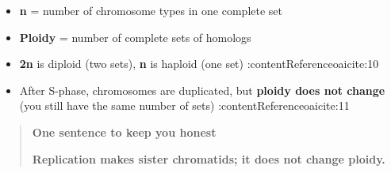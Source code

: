 \documentclass[
  letterpaper,
  DIV=11,
  numbers=noendperiod]{scrartcl}
\providecommand{\tightlist}{%
  \setlength{\itemsep}{0pt}\setlength{\parskip}{0pt}}
\begin{document}
\begin{tcolorbox}
\begin{itemize}
\tightlist
\item
  \textbf{n} = number of chromosome types in one complete set\\
\item
  \textbf{Ploidy} = number of complete sets of homologs\\
\item
  \textbf{2n} is diploid (two sets), \textbf{n} is haploid (one set)
  :contentReference{oaicite:10}
\item
  After S-phase, chromosomes are duplicated, but \textbf{ploidy does not
  change} (you still have the same number of sets)
  :contentReference{oaicite:11}
\end{itemize}

\begin{quote}
\textbf{One sentence to keep you honest}

\textbf{Replication makes sister chromatids; it does not change ploidy.}
\end{quote}

\end{tcolorbox}
\end{document}
